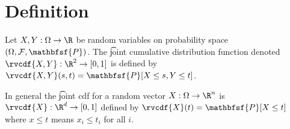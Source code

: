 

\section*{Definition}

Let $X, Y: \Omega  \to \R $ be random variables on probability space $(\Omega , \mathcal{F} , \mathbfsf{P} )$.
The \t{joint cumulative distribution function} denoted $\rvcdf{X,Y}: \R ^2 \to [0, 1]$ is defined by $\rvcdf{X,Y}(s,t) = \mathbfsf{P} [X \leq s, Y \leq t]$.

In general the \t{joint cdf} for a random vector $X: \Omega \to \R ^n$ is $\rvcdf{X}: \R ^d \to [0,1]$ defined by $\rvcdf{X}(t) = \mathbfsf{P} [X \leq t]$ where $x \leq t$ means $x_i \leq t_i$ for all $i$.

\blankpage